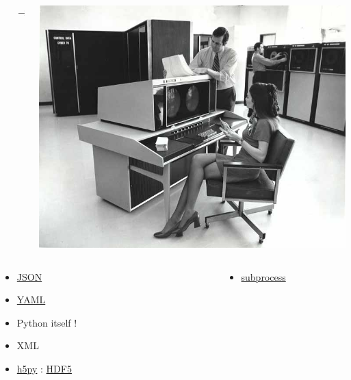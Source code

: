 \begin{frame}
\begin{columns}
\begin{column}{.3\textwidth}
    \end{column}
    \begin{column}{.05\textwidth}
      \centerline{$\longrightarrow$}
    \end{column}
    \begin{column}{.3\textwidth}
      \begin{center}
        \includegraphics[width=.9\textwidth]{images/mainframe-console.jpg}
      \end{center}
    \end{column}
  \end{columns}
  \begin{columns}[t]
  \fontsize{8pt}{8pt}\selectfont
    \begin{column}{.3\textwidth}
      \begin{itemize}
      \item \href{https://docs.python.org/3/library/json.html}{JSON} %
      \item \href{http://pyyaml.org}{YAML}
      \item Python itself !
      \item XML
      \item \href{http://www.h5py.org}{h5py} : \href{https://www.hdfgroup.org}{HDF5}
      \end{itemize}
    \end{column}
    \begin{column}{.05\textwidth}
    \end{column}
    \begin{column}{.3\textwidth}
      \begin{itemize}
      \item \href{https://docs.python.org/3/library/subprocess.html}{subprocess}

\end{itemize}
\end{column}
\end{columns}
\end{frame}

